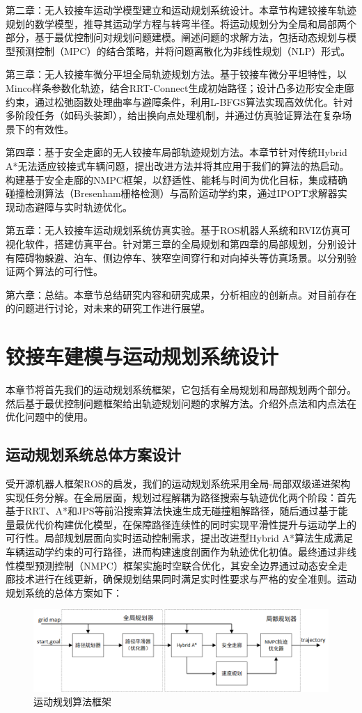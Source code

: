 \documentclass[master,academic]{ysuthesis} %
\begin{document}
	第二章：无人铰接车运动学模型建立和运动规划系统设计​。本章节构建铰接车轨迹规划的数学模型，推导其运动学方程与转弯半径。将运动规划分为全局和局部两个部分，基于最优控制问对规划问题建模。阐述问题的求解方法，包括动态规划与模型预测控制（MPC）的结合策略，并将问题离散化为非线性规划（NLP）形式。

	第三章：无人铰接车微分平坦全局轨迹规划方法​。基于铰接车微分平坦特性，以Minco样条参数化轨迹，结合RRT-Connect生成初始路径；设计凸多边形安全走廊约束，通过松弛函数处理曲率与避障条件，利用L-BFGS算法实现高效优化。针对多阶段任务（如码头装卸），给出换向点处理机制，并通过仿真验证算法在复杂场景下的有效性。

	第四章：基于安全走廊的无人铰接车局部轨迹规划方法​。本章节针对传统Hybrid A*无法适应铰接式车辆问题，提出改进方法并将其应用于我们的算法的热启动。构建基于安全走廊的NMPC框架，以舒适性、能耗与时间为优化目标，集成精确碰撞检测算法（Bresenham栅格检测）与高阶运动学约束，通过IPOPT求解器实现动态避障与实时轨迹优化。

	第五章：无人铰接车运动规划系统仿真实验​。基于ROS机器人系统和RVIZ仿真可视化软件，搭建仿真平台。针对第三章的全局规划和第四章的局部规划，分别设计有障碍物躲避、泊车、侧边停车、狭窄空间穿行和对向掉头等仿真场景。以分别验证两个算法的可行性。

	第六章：总结​。本章节总结研究内容和研究成果，分析相应的创新点。对目前存在的问题进行讨论，对未来的研究工作进行展望。

	\chapter{铰接车建模与运动规划系统设计}
	本章节将首先我们的运动规划系统框架，它包括有全局规划和局部规划两个部分。然后基于最优控制问题框架给出轨迹规划问题的求解方法。介绍外点法和内点法在优化问题中的使用。
	\section{运动规划系统总体方案设计}
	受开源机器人框架ROS的启发，我们的运动规划系统采用全局-局部双级递进架构实现任务分解。在全局层面，规划过程解耦为路径搜索与轨迹优化两个阶段：首先基于RRT、A*和JPS等前沿搜索算法快速生成无碰撞粗解路径，随后通过基于能量最优代价构建优化模型，在保障路径连续性的同时实现平滑性提升与运动学上的可行性。局部规划层面向实时运动控制需求，提出改进型Hybrid A*算法生成满足车辆运动学约束的可行路径，进而构建速度剖面作为轨迹优化初值。最终通过非线性模型预测控制（NMPC）框架实施时空联合优化，其安全边界通过动态安全走廊技术进行在线更新，确保规划结果同时满足实时性要求与严格的安全准则。运动规划系统的总体方案如下：
		\begin{figure}[!ht]
			\centering
			\includegraphics[width=1.0\textwidth]{运动规划算法框架.png}
			\caption{运动规划算法框架}
			\label{fig:运动规划算法框架}
		\end{figure}
\end{document}
